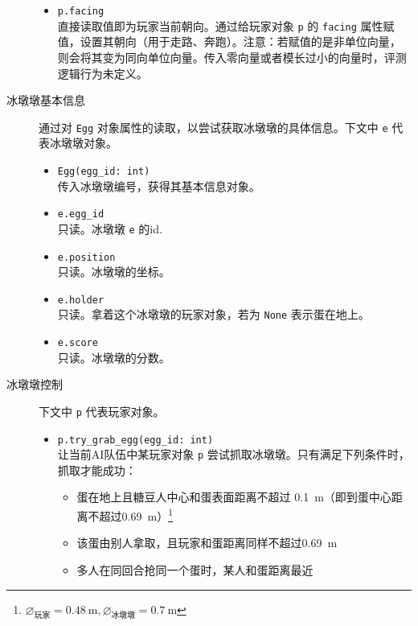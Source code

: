 \documentclass{article}
\begin{document}
\begin{description}
\begin{itemize}
\item
\lstinline{p.facing}\\[-2pt]
直接读取值即为玩家当前朝向。通过给玩家对象 \lstinline{p} 的 \lstinline{facing} 属性赋值，设置其朝向（用于走路、奔跑）。注意：若赋值的是非单位向量，则会将其变为同向单位向量。传入零向量或者模长过小的向量时，评测逻辑行为未定义。

\end{itemize}

\item[冰墩墩基本信息] 通过对 \lstinline{Egg} 对象属性的读取，以尝试获取冰墩墩的具体信息。下文中 \lstinline{e} 代表冰墩墩对象。

\begin{itemize}
\item
\lstinline{Egg(egg_id: int)}\\[-2pt]
传入冰墩墩编号，获得其基本信息对象。

\item \lstinline{e.egg_id}\\[-2pt]
只读。冰墩墩 \lstinline{e} 的id.

\item \lstinline{e.position}\\[-2pt]
只读。冰墩墩的坐标。

\item \lstinline{e.holder}\\[-2pt]
只读。拿着这个冰墩墩的玩家对象，若为 \lstinline{None} 表示蛋在地上。

\item \lstinline{e.score}\\[-2pt]
只读。冰墩墩的分数。
\end{itemize}

\item[冰墩墩控制] 下文中 \lstinline{p} 代表玩家对象。

\begin{itemize}

\item
\lstinline{p.try_grab_egg(egg_id: int)}\\[-2pt]
让当前AI队伍中某玩家对象 \lstinline{p} 尝试抓取冰墩墩。只有满足下列条件时，抓取才能成功：
\begin{itemize}\setlength\itemsep{0em}
\item 蛋在地上且糖豆人中心和蛋表面距离不超过 \SI{0.1}{\meter}（即到蛋中心距离不超过\SI{0.69}{\meter}）\footnote{$\diameter_{\text{玩家}}=\SI{0.48}{\meter},\diameter_{\text{冰墩墩}}=\SI{0.7}{\meter}$}
\item 该蛋由别人拿取，且玩家和蛋距离同样不超过\SI{0.69}{\meter}
\item 多人在同回合抢同一个蛋时，某人和蛋距离最近
\end{itemize}


\end{itemize}
\end{description}
\end{document}
